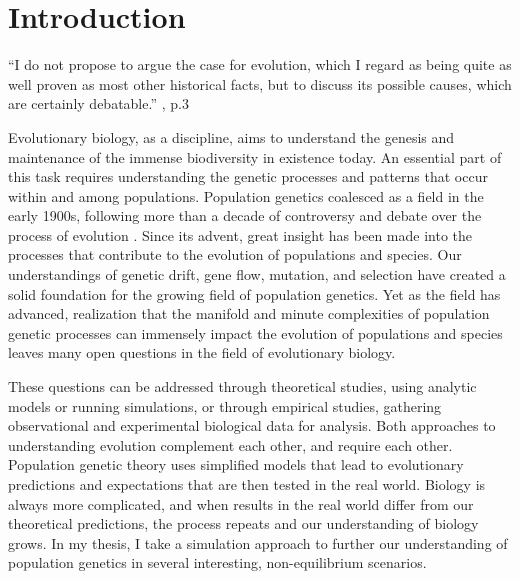 \chapter{Introduction}
\label{chap:introduction}

\begin{quoteshrink}
  ``I do not propose to argue the case for evolution, which I regard as being quite as well proven as most other historical facts, but to discuss its possible causes, which are certainly debatable.''
  \hfill\citet{Haldane:1932}, p.3
\end{quoteshrink}

\noindent



Evolutionary biology, as a discipline, aims to understand the genesis and maintenance of the immense biodiversity in existence today. An essential part of this task requires understanding the genetic processes and patterns that occur within and among populations. Population genetics coalesced as a field in the early 1900s, following more than a decade of controversy and debate over the process of evolution \citep{Provine:2001}. Since its advent, great insight has been made into the processes that contribute to the evolution of populations and species. Our understandings of genetic drift, gene flow, mutation, and selection have created a solid foundation for the growing field of population genetics. Yet as the field has advanced, realization that the manifold and minute complexities of population genetic processes can immensely impact the evolution of populations and species leaves many open questions in the field of evolutionary biology.

These questions can be addressed through theoretical studies, using analytic models or running simulations, or through empirical studies, gathering observational and experimental biological data for analysis. Both approaches to understanding evolution complement each other, and require each other. Population genetic theory uses simplified models that lead to evolutionary predictions and expectations that are then tested in the real world. Biology is always more complicated, and when results in the real world differ from our theoretical predictions, the process repeats and our understanding of biology grows. In my thesis, I take a simulation approach to further our understanding of population genetics in several interesting, non-equilibrium scenarios.


